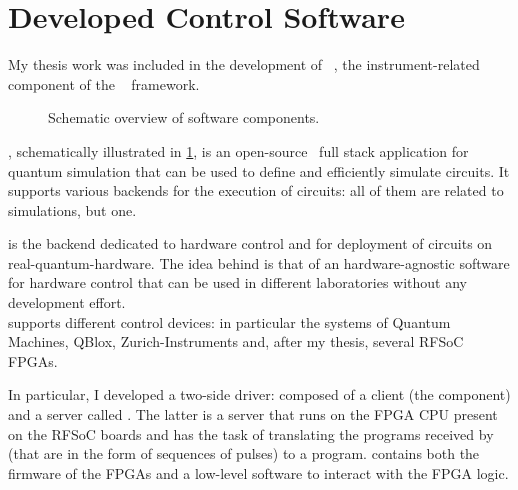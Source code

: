 \section{Developed Control Software}\label{sec:software}
My thesis work was included in the development of \Qibolab~\cite{Efthymiou_2023}, the instrument-related component of the \Qibo~\cite{qibo-website} framework.

\begin{figure}[ht]
    \caption{Schematic overview of \Qibo software components.}
    \label{fig:qibo-ecosystem}
\end{figure}

\Qibo, schematically illustrated in \cref{fig:qibo-ecosystem}, is an open-source~\cite{qibo-github,qibolab-github,qibosoq-github} full stack application for quantum simulation that can be used to define and efficiently simulate circuits. 
It supports various backends for the execution of circuits: all of them are related to simulations, but one.

\Qibolab is the backend dedicated to hardware control and for deployment of circuits on real-quantum-hardware.
The idea behind \Qibolab is that of an hardware-agnostic software for hardware control that can be used in different laboratories without any development effort.\\
\Qibolab supports different control devices: in particular the systems of Quantum Machines, QBlox, Zurich-Instruments and, after my thesis, several RFSoC FPGAs.

In particular, I developed a two-side driver: composed of a client (the \Qibolab component) and a server called \Qibosoq.
The latter is a server that runs on the FPGA CPU present on the RFSoC boards and has the task of translating the programs received by \Qibolab (that are in the form of sequences of pulses) to a \Qick program.
\Qick contains both the firmware of the FPGAs and a low-level software to interact with the FPGA logic.

